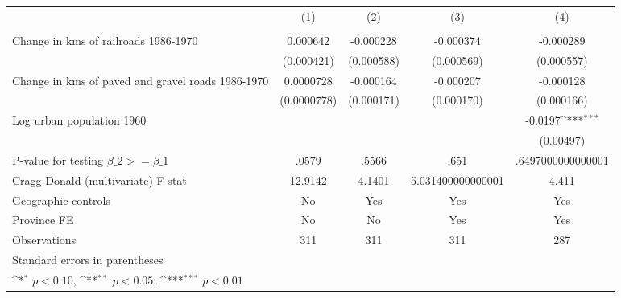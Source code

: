 {
\def\sym#1{\ifmmode^{#1}\else\(^{#1}\)\fi}
\begin{tabular}{l*{4}{c}}
\hline\hline
                &\multicolumn{1}{c}{(1)}&\multicolumn{1}{c}{(2)}&\multicolumn{1}{c}{(3)}&\multicolumn{1}{c}{(4)}\\
                &\multicolumn{1}{c}{}&\multicolumn{1}{c}{}&\multicolumn{1}{c}{}&\multicolumn{1}{c}{}\\
\hline
Change in kms of railroads 1986-1970& 0.000642         &-0.000228         &-0.000374         &-0.000289         \\
                &(0.000421)         &(0.000588)         &(0.000569)         &(0.000557)         \\
[1em]
Change in kms of paved and gravel roads 1986-1970&0.0000728         &-0.000164         &-0.000207         &-0.000128         \\
                &(0.0000778)         &(0.000171)         &(0.000170)         &(0.000166)         \\
[1em]
Log urban population 1960&                  &                  &                  &  -0.0197\sym{***}\\
                &                  &                  &                  &(0.00497)         \\
\hline
P-value for testing $\beta\_{2} >= \beta\_{1}$&    .0579         &    .5566         &     .651         &.6497000000000001         \\
Cragg-Donald (multivariate) F-stat&  12.9142         &   4.1401         &5.031400000000001         &    4.411         \\
Geographic controls&       No         &      Yes         &      Yes         &      Yes         \\
Province FE     &       No         &       No         &      Yes         &      Yes         \\
Observations    &      311         &      311         &      311         &      287         \\
\hline\hline
\multicolumn{5}{l}{\footnotesize Standard errors in parentheses}\\
\multicolumn{5}{l}{\footnotesize \sym{*} \(p<0.10\), \sym{**} \(p<0.05\), \sym{***} \(p<0.01\)}\\
\end{tabular}
}
